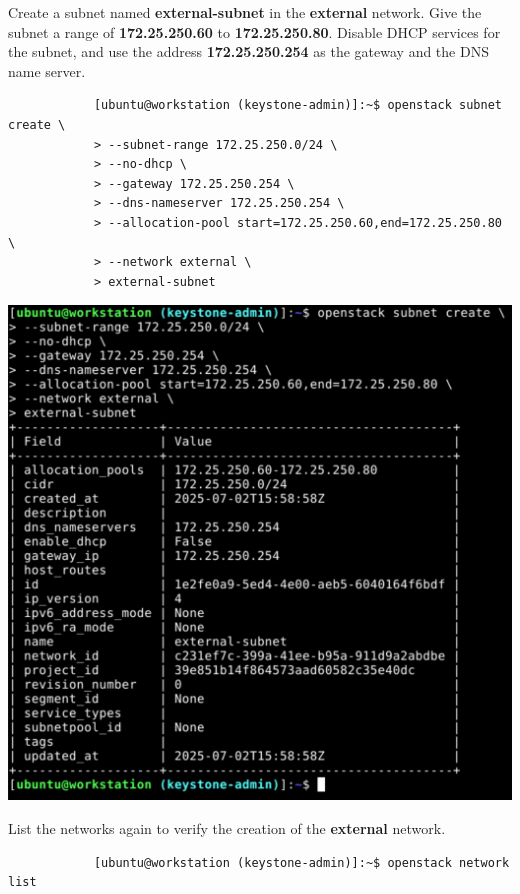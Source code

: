 \documentclass[letterpaper, 12pt]{article}
\begin{document}
\begin{enumerate}
    \begin{labstep}
        Create a subnet named \textbf{external-subnet} in the \textbf{external} network.
        Give the subnet a range of \textbf{172.25.250.60} to \textbf{172.25.250.80}.
        Disable DHCP services for the subnet, and use the address \textbf{172.25.250.254} as the gateway and the DNS name server.
        \begin{lstlisting}
            [ubuntu@workstation (keystone-admin)]:~$ openstack subnet create \
            > --subnet-range 172.25.250.0/24 \
            > --no-dhcp \
            > --gateway 172.25.250.254 \
            > --dns-nameserver 172.25.250.254 \
            > --allocation-pool start=172.25.250.60,end=172.25.250.80 \
            > --network external \
            > external-subnet
        \end{lstlisting}

        \begin{center}
            \includegraphics[width=\linewidth]{images/part5/step11.png}
        \end{center}
    \end{labstep}

    \begin{labstep}
        List the networks again to verify the creation of the \textbf{external} network.
        \begin{lstlisting}
            [ubuntu@workstation (keystone-admin)]:~$ openstack network list
        \end{lstlisting}


\end{labstep}
\end{enumerate}
\end{document}
